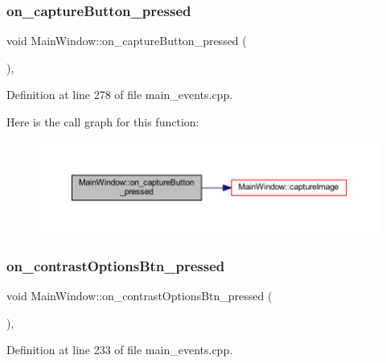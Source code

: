 \subsubsection{\texorpdfstring{on\_captureButton\_pressed}{on\_captureButton\_pressed}}
{\footnotesize\ttfamily void Main\+Window\+::on\+\_\+capture\+Button\+\_\+pressed (\begin{DoxyParamCaption}{ }\end{DoxyParamCaption})\hspace{0.3cm}{\ttfamily [private]}, {\ttfamily [slot]}}



Definition at line 278 of file main\+\_\+events.\+cpp.

Here is the call graph for this function\+:
\nopagebreak
\begin{figure}[H]
\begin{center}
\leavevmode
\includegraphics[width=350pt]{classMainWindow_a2a1fcefe2bf1f110eb2c589ac57b07d7_cgraph}
\end{center}
\end{figure}
\mbox{\label{classMainWindow_a803bb81c63591b7f6c3306f712438378}} 
\subsubsection{\texorpdfstring{on\_contrastOptionsBtn\_pressed}{on\_contrastOptionsBtn\_pressed}}
{\footnotesize\ttfamily void Main\+Window\+::on\+\_\+contrast\+Options\+Btn\+\_\+pressed (\begin{DoxyParamCaption}{ }\end{DoxyParamCaption})\hspace{0.3cm}{\ttfamily [private]}, {\ttfamily [slot]}}



Definition at line 233 of file main\+\_\+events.\+cpp.

